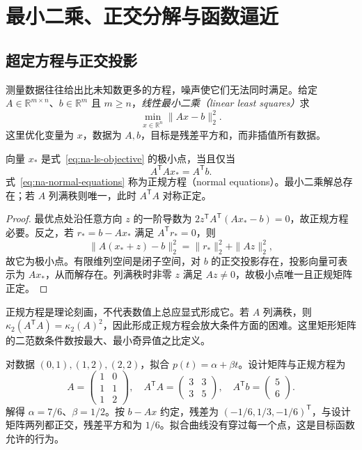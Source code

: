 \setcounter{chapter}{4} %
\chapter{最小二乘、正交分解与函数逼近}
\label{chap:na-ls}

\section{超定方程与正交投影}
测量数据往往给出比未知数更多的方程，噪声使它们无法同时满足。给定 $A\in\mathbb R^{m\times n}$、$b\in\mathbb R^m$ 且 $m\ge n$，\emph{线性最小二乘（linear least squares）}求
\begin{equation}
 \min_{x\in\mathbb R^n}\|Ax-b\|_2^2.
 \label{eq:na-ls-objective}
\end{equation}
这里优化变量为 $x$，数据为 $A,b$，目标是残差平方和，而非插值所有数据。

\begin{theorem}[正规方程与唯一性]
\label{thm:na-normal-equations}
向量 $x_*$ 是式~\eqref{eq:na-ls-objective} 的极小点，当且仅当
\begin{equation}
 A^{\mathsf T}Ax_*=A^{\mathsf T}b.
 \label{eq:na-normal-equations}
\end{equation}
式~\eqref{eq:na-normal-equations} 称为正规方程（normal equations）。最小二乘解总存在；若 $A$ 列满秩则唯一，此时 $A^{\mathsf T}A$ 对称正定。
\end{theorem}
\begin{proof}
最优点处沿任意方向 $z$ 的一阶导数为 $2z^{\mathsf T}A^{\mathsf T}(Ax_*-b)=0$，故正规方程必要。反之，若 $r_*=b-Ax_*$ 满足 $A^{\mathsf T}r_*=0$，则
\[
 \|A(x_*+z)-b\|_2^2=\|r_*\|_2^2+\|Az\|_2^2,
\]
故它为极小点。有限维列空间是闭子空间，对 $b$ 的正交投影存在，投影向量可表示为 $Ax_*$，从而解存在。列满秩时非零 $z$ 满足 $Az\ne0$，故极小点唯一且正规矩阵正定。
\end{proof}

正规方程是理论刻画，不代表数值上总应显式形成它。若 $A$ 列满秩，则 $\kappa_2(A^{\mathsf T}A)=\kappa_2(A)^2$，因此形成正规方程会放大条件方面的困难。这里矩形矩阵的二范数条件数按最大、最小奇异值之比定义。

\begin{example}[直线拟合]
对数据 $(0,1),(1,2),(2,2)$，拟合 $p(t)=\alpha+\beta t$。设计矩阵与正规方程为
\[
 A=\begin{pmatrix}1&0\\1&1\\1&2\end{pmatrix},\quad
 A^{\mathsf T}A=\begin{pmatrix}3&3\\3&5\end{pmatrix},\quad
 A^{\mathsf T}b=\begin{pmatrix}5\\6\end{pmatrix}.
\]
解得 $\alpha=7/6$、$\beta=1/2$。按 $b-Ax$ 约定，残差为 $(-1/6,1/3,-1/6)^{\mathsf T}$，与设计矩阵两列都正交，残差平方和为 $1/6$。拟合曲线没有穿过每一个点，这是目标函数允许的行为。
\end{example}

